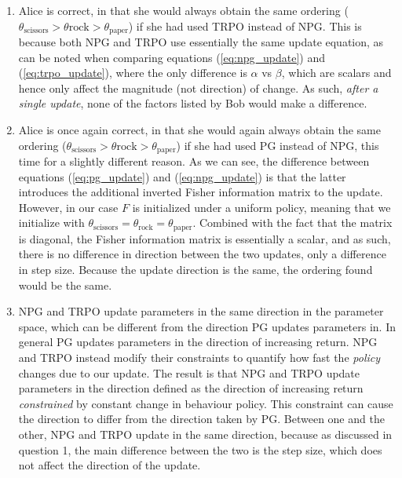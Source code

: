 \documentclass{article}
\begin{document}
\begin{enumerate}
	\item Alice is correct, in that she would always obtain the same ordering
	      ($\theta_{\text{scissors}} > \theta{\text{rock}} > \theta_{\text{paper}}$) if she had used TRPO
	      instead of NPG. This is because both NPG and TRPO use essentially the same update equation, as
	      can be noted when comparing equations (\ref{eq:npg_update}) and (\ref{eq:trpo_update}), where
	      the only difference is $\alpha$ vs $\beta$, which are scalars and hence only affect the
	      magnitude (not direction) of change. As such, \textit{after a single update}, none of the
	      factors listed by Bob would make a difference.
	\item Alice is once again correct, in that she would again always obtain the same ordering
	      ($\theta_{\text{scissors}} > \theta{\text{rock}} > \theta_{\text{paper}}$) if she had used PG
	      instead of NPG, this time for a slightly different reason. As we can see, the difference between
	      equations (\ref{eq:pg_update}) and (\ref{eq:npg_update}) is that the latter introduces the
	      additional inverted Fisher information matrix to the update. However, in our case $F$ is
	      initialized under a uniform policy, meaning that we initialize with $\theta_{\text{scissors}}
		      = \theta_{\text{rock}} = \theta_{\text{paper}}$. Combined with the fact that the matrix is
	      diagonal, the Fisher information matrix is essentially a scalar, and as such, there is no
	      difference in direction between the two updates, only a difference in step size. Because the
	      update direction is the same, the ordering found would be the same.
	\item NPG and TRPO update parameters in the same direction in the parameter space, which can be
	      different from the direction PG updates parameters in. In general PG updates parameters in the
	      direction of increasing return. NPG and TRPO instead modify their constraints to quantify how
	      fast the \textit{policy} changes due to our update. The result is that NPG and TRPO update
	      parameters in the direction defined as the direction of increasing return \textit{constrained}
	      by constant change in behaviour policy. This constraint can cause the direction to differ from
	      the direction taken by PG. Between one and the other, NPG and TRPO update in the same direction,
	      because as discussed in question 1, the main difference between the two is the step size, which
	      does not affect the direction of the update.
\end{enumerate}


\end{document}
